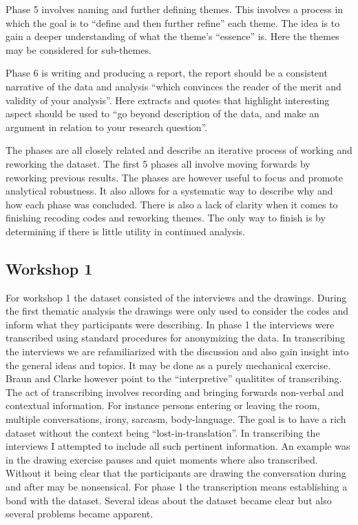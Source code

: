 \documentclass[UKenglish]{uiophd}
\begin{document}
		Phase 5 involves naming and further defining themes. This involves a process in which the goal is to ``define and then further refine''\cite[p.92]{Braun2006Using} each theme. The idea is to gain a deeper understanding of what the theme's ``essence''\cite[p.92]{Braun2006Using} is. Here the themes may be considered for sub-themes. 

		Phase 6 is writing and producing a report, the report should be a consistent narrative of the data and analysis ``which convinces the reader of the merit and validity of your analysis''\cite[p.93]{Braun2006Using}. Here extracts and quotes that highlight interesting aspect should be used to ``go beyond description of the data, and make an argument in relation to your research question''\cite[p.93]{Braun2006Using}.

		The phases are all closely related and describe an iterative process of working and reworking the dataset. The first 5 phases all involve moving forwards by reworking previous results. The phases are however useful to focus and promote analytical robustness. It also allows for a systematic way to describe why and how each phase was concluded. There is also a lack of clarity when it comes to finishing recoding codes and reworking themes. The only way to finish is by determining if there is little utility in continued analysis\cite[p.92]{Braun2006Using}.

	\subsection{Workshop 1} 
		For workshop 1 the dataset consisted of the interviews and the drawings. During the first thematic analysis the drawings were only used to consider the codes and inform what they participants were describing. In phase 1 the interviews were transcribed using standard procedures for anonymizing the data. In transcribing the interviews we are refamiliarized with the discussion and also gain insight into the general ideas and topics. It may be done as a purely mechanical exercise. Braun and Clarke however point to the ``interpretive''\cite[p.88]{Braun2006Using} qualitites of transcribing. The act of transcribing involves recording and bringing forwards non-verbal and contextual information. For instance persons entering or leaving the room, multiple conversations, irony, sarcasm, body-language. The goal is to have a rich dataset without the context being ``lost-in-translation''. In transcribing the interviews I attempted to include all such pertinent information. An example was in the drawing exercise pauses and quiet moments where also transcribed. Without it being clear that the participants are drawing the conversation during and after may be nonsensical. For phase 1 the transcription means establishing a bond with the dataset. Several ideas about the dataset became clear but also several problems became apparent. 
\end{document}
